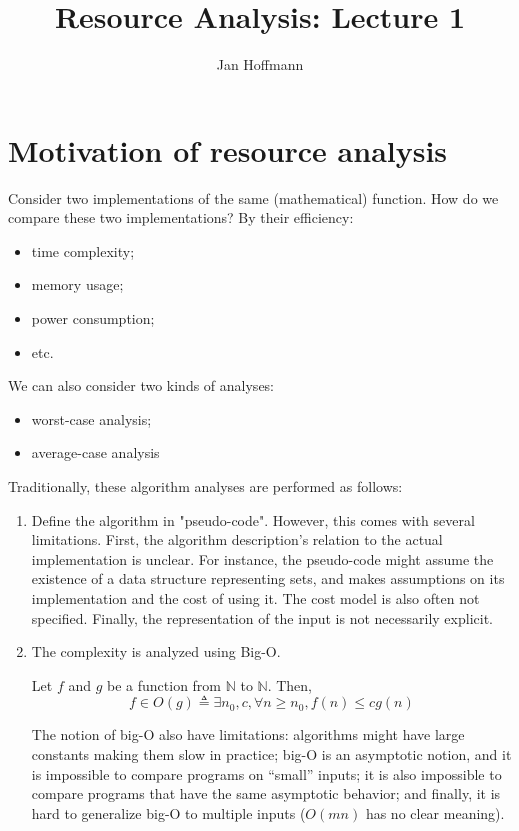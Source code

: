 \documentclass[ manuscript,screen, nonacm]{acmart}
\begin{document}
\title{Resource Analysis: Lecture 1}

\author{Jan Hoffmann}

\maketitle


\section{Motivation of resource analysis}

Consider two implementations of the same (mathematical) function. 
How do we compare these two implementations? By their efficiency:
\begin{itemize}
  \item time complexity;
  \item memory usage;
  \item power consumption;
  \item etc.
\end{itemize}

We can also consider two kinds of analyses:
\begin{itemize}
    \item worst-case analysis;
    \item average-case analysis
\end{itemize}

Traditionally, these algorithm analyses are performed as follows:
\begin{enumerate}
    \item Define the algorithm in "pseudo-code". However, this comes with several limitations.
    First, the algorithm description's relation to the actual implementation is unclear. For instance, the
    pseudo-code might assume the existence of a data structure representing sets, and makes assumptions
    on its implementation and the cost of using it. 
    The cost model is also often not specified. 
    Finally, the representation of the input is not necessarily explicit.
    \item The complexity is analyzed using Big-O.
    \begin{definition}[Big-O]\label{def:big-o}
        Let \(f\) and \(g\) be a function from \(\mathbb{N}\) to \(\mathbb{N}\).
        Then,
        \[
          f \in O(g) \triangleq \exists n_0, c, \forall n\geq n_0, f(n) \leq c g(n)
        \]
    \end{definition}
    The notion of big-O also have limitations: algorithms might have large constants making them slow
    in practice; big-O is an asymptotic notion, and it is impossible to compare programs on ``small''
    inputs; it is also impossible to compare programs that have the same asymptotic behavior; and finally,
    it is hard to generalize big-O to multiple inputs (\(O(mn)\) has no clear meaning).
\end{enumerate}
\end{document}
